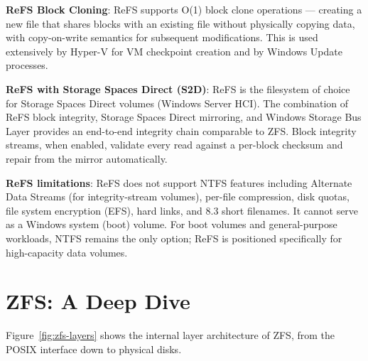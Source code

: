 \textbf{ReFS Block Cloning}: ReFS supports O(1) block clone operations --- creating a new file that shares blocks with an existing file without physically copying data, with copy-on-write semantics for subsequent modifications. This is used extensively by Hyper-V for VM checkpoint creation and by Windows Update processes.

\textbf{ReFS with Storage Spaces Direct (S2D)}: ReFS is the filesystem of choice for Storage Spaces Direct volumes (Windows Server HCI). The combination of ReFS block integrity, Storage Spaces Direct mirroring, and Windows Storage Bus Layer provides an end-to-end integrity chain comparable to ZFS. Block integrity streams, when enabled, validate every read against a per-block checksum and repair from the mirror automatically.

\textbf{ReFS limitations}: ReFS does not support NTFS features including Alternate Data Streams (for integrity-stream volumes), per-file compression, disk quotas, file system encryption (EFS), hard links, and 8.3 short filenames. It cannot serve as a Windows system (boot) volume. For boot volumes and general-purpose workloads, NTFS remains the only option; ReFS is positioned specifically for high-capacity data volumes.

\section{ZFS: A Deep Dive}
Figure~\ref{fig:zfs-layers} shows the internal layer architecture of ZFS, from the POSIX interface down to physical disks.


